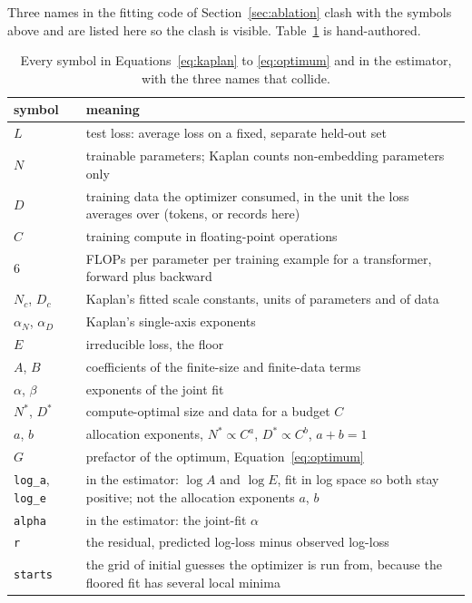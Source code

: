 

Three names in the fitting code of Section~\ref{sec:ablation} clash with the
symbols above and are listed here so the clash is visible. Table~\ref{tab:symbols}
is hand-authored.

\begin{table}[htbp]
\centering\footnotesize
\caption{Every symbol in Equations~\ref{eq:kaplan} to \ref{eq:optimum} and in the
estimator, with the three names that collide.}
\label{tab:symbols}
\begin{tabular}{lp{}}
\toprule
symbol & meaning \\
\midrule
$L$ & test loss: average loss on a fixed, separate held-out set \\
$N$ & trainable parameters; Kaplan counts non-embedding parameters only \\
$D$ & training data the optimizer consumed, in the unit the loss averages over (tokens, or records here) \\
$C$ & training compute in floating-point operations \\
$6$ & FLOPs per parameter per training example for a transformer, forward plus backward \\
$N_c$, $D_c$ & Kaplan's fitted scale constants, units of parameters and of data \\
$\alpha_N$, $\alpha_D$ & Kaplan's single-axis exponents \\
$E$ & irreducible loss, the floor \\
$A$, $B$ & coefficients of the finite-size and finite-data terms \\
$\alpha$, $\beta$ & exponents of the joint fit \\
$N^*$, $D^*$ & compute-optimal size and data for a budget $C$ \\
$a$, $b$ & allocation exponents, $N^* \propto C^a$, $D^* \propto C^b$, $a + b = 1$ \\
$G$ & prefactor of the optimum, Equation~\ref{eq:optimum} \\
\addlinespace
\texttt{log\_a}, \texttt{log\_e} & in the estimator: $\log A$ and $\log E$, fit in log space so both stay positive; not the allocation exponents $a$, $b$ \\
\texttt{alpha} & in the estimator: the joint-fit $\alpha$ \\
\texttt{r} & the residual, predicted log-loss minus observed log-loss \\
\texttt{starts} & the grid of initial guesses the optimizer is run from, because the floored fit has several local minima \\
\bottomrule
\end{tabular}
\end{table}
